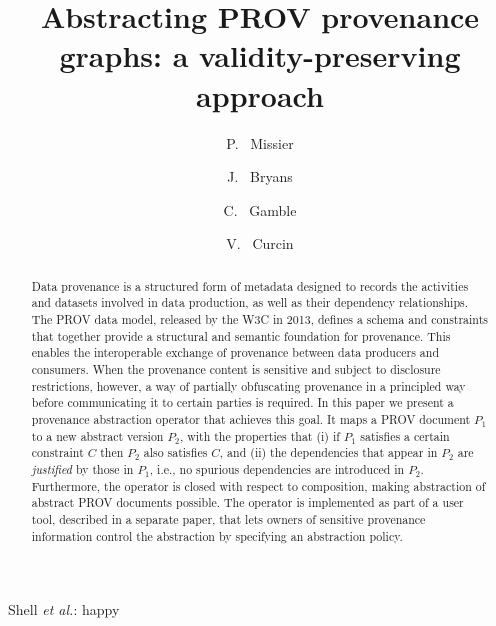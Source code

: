 \documentclass{elsarticle}
\begin{document}
\title{Abstracting PROV provenance graphs: a validity-preserving approach}


\author[ncl]{P. ~Missier }

\author[cov]{J. ~Bryans}

\author[ncl]{C. ~Gamble}
    
\author[kcl]{V. ~Curcin}

\address[ncl]{School of Computing Science, Newcastle University, UK}
\address[cov]{Institute for Future Transport and Cities, Coventry University, UK}
\address[kcl]{Department of Computing, Imperial College, London, UK}


%
{Shell \MakeLowercase{\textit{et al.}}: happy}


\begin{abstract}
Data provenance is a structured form of metadata designed to records the activities and datasets involved in data production, as well as their dependency relationships. The PROV data model, released by the W3C in 2013, defines a schema and constraints that together provide a structural and semantic foundation for provenance. This enables the interoperable exchange of provenance between data producers and consumers. When the provenance content is sensitive and subject to disclosure restrictions, however, a way of partially obfuscating provenance in a principled way before communicating it to certain parties is required. In this paper we present a provenance abstraction operator that achieves this goal. It maps a PROV document $P_1$  to a new abstract version $P_2$, with the properties that (i) if $P_1$ satisfies a certain constraint $C$ then $P_2$ also satisfies $C$, and (ii) the dependencies that appear in $P_2$ are \textit{justified} by those in $P_1$, i.e., no spurious dependencies are introduced in $P_2$. Furthermore, the operator is closed with respect to composition, making abstraction of abstract PROV documents possible.  The operator is implemented as part of a user tool, described in a separate paper, that lets owners of sensitive provenance information control the abstraction by specifying an abstraction policy.
\end{abstract}
\end{document}
